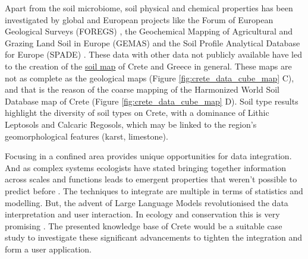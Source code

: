 Apart from the soil microbiome, soil physical and chemical properties has been
investigated by global and European projects like the Forum of European Geological Surveys
(FOREGS) \parencite{nerc19017}, the Geochemical Mapping of Agricultural and Grazing Land
Soil in Europe (GEMAS) \parencite{REIMANN2018302} and the Soil Profile Analytical
Database for Europe (SPADE) \parencite{Hiederer2006}. These data with other data
not publicly available have led to the creation of the \href{https://esdac.jrc.ec.europa.eu/content/soil-map-greece-0}{soil map} of Crete 
and Greece in general. These maps are not as complete as the geological maps (Figure \ref{fig:crete_data_cube_map} C), 
and that is the reason of the coarse mapping of the Harmonized World Soil Database map of Crete (Figure \ref{fig:crete_data_cube_map} D).
Soil type results highlight the diversity of soil types on Crete, with a
dominance of Lithic Leptosols and Calcaric Regosols, which may be linked to the
region's geomorphological features (karst, limestone).

Focusing in a confined area provides unique opportunities for data integration.
And as complex systems ecologists have stated bringing together information across
scales \parencite{brown2004METABOLIC} and functions leads to emergent properties that weren't possible to 
predict before \parencite{smith2016Origin}. The techniques to integrate are multiple in terms of statistics and modelling. But,
the advent of Large Language Models revolutionised the data interpretation and 
user interaction. In ecology and conservation this is very promising \parencite{doi2024biodiversity}.
The presented knowledge base of Crete would be a suitable 
case study to investigate these significant advancements to tighten the integration and form a 
user application.

